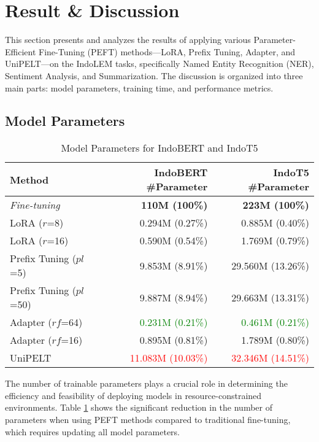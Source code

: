 \section{Result \& Discussion}

This section presents and analyzes the results of applying various Parameter-Efficient Fine-Tuning (PEFT) methods—LoRA, Prefix Tuning, Adapter, and UniPELT—on the IndoLEM tasks, specifically Named Entity Recognition (NER), Sentiment Analysis, and Summarization. The discussion is organized into three main parts: model parameters, training time, and performance metrics.

\subsection{Model Parameters}

\begin{table}[!ht]
    \centering
    \caption{Model Parameters for IndoBERT and IndoT5}
    \label{table:param-model}
    \begin{tabular}{l|r|r}
        \toprule
        \textbf{Method} & \textbf{IndoBERT \#Parameter} & \textbf{IndoT5 \#Parameter} \\
        \midrule
        \textit{Fine-tuning} & \textbf{110M (100\%)} & \textbf{223M (100\%)} \\
        LoRA ($r$=8) & 0.294M (0.27\%) & 0.885M (0.40\%) \\
        LoRA ($r$=16) & 0.590M (0.54\%) & 1.769M (0.79\%) \\
        Prefix Tuning ($pl$=5) & 9.853M (8.91\%) & 29.560M (13.26\%) \\
        Prefix Tuning ($pl$=50) & 9.887M (8.94\%) & 29.663M (13.31\%) \\
        Adapter ($rf$=64) & \textcolor{Green}{0.231M (0.21\%)} & \textcolor{Green}{0.461M (0.21\%)} \\
        Adapter ($rf$=16) & 0.895M (0.81\%) & 1.789M (0.80\%) \\
        UniPELT & \textcolor{Red}{11.083M (10.03\%)} & \textcolor{Red}{32.346M (14.51\%)} \\
        \bottomrule
    \end{tabular}
\end{table}

The number of trainable parameters plays a crucial role in determining the efficiency and feasibility of deploying models in resource-constrained environments. Table \ref{table:param-model} shows the significant reduction in the number of parameters when using PEFT methods compared to traditional fine-tuning, which requires updating all model parameters.


